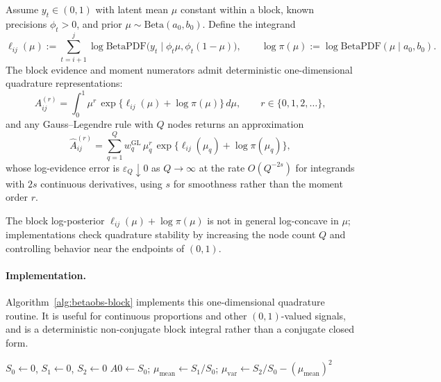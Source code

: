 \begin{proposition}
\label{prop:beta-block}
Assume $y_t\in(0,1)$ with latent mean $\mu$ constant within a block, known precisions
$\phi_t>0$, and prior $\mu\sim\mathrm{Beta}(a_0,b_0)$. Define the integrand
\[
\ell_{ij}(\mu)
:= \sum_{t=i+1}^j \log\mathrm{BetaPDF}\big(y_t\mid\phi_t\mu,\phi_t(1-\mu)\big),
\qquad \log\pi(\mu) := \log\mathrm{BetaPDF}(\mu\mid a_0,b_0).
\]
The block evidence and moment numerators admit deterministic one-dimensional quadrature
representations:
\[
A^{(r)}_{ij}
= \int_0^1 \mu^r\,\exp\!\big\{\ell_{ij}(\mu)+\log\pi(\mu)\big\}\,d\mu,
\qquad r\in\{0,1,2,\dots\},
\]
and any Gauss--Legendre rule with $Q$ nodes returns an approximation
\[
\widehat A^{(r)}_{ij}
= \sum_{q=1}^Q w_q^{\mathrm{GL}}\,\mu_q^r\,\exp\{\ell_{ij}(\mu_q)+\log\pi(\mu_q)\},
\]
whose log-evidence error is $\varepsilon_Q\downarrow 0$ as $Q\to\infty$ at the rate $O(Q^{-2s})$
for integrands with $2s$ continuous derivatives, using $s$ for smoothness rather than the moment
order $r$.
\end{proposition}

\begin{remark}
\label{rem:beta-quadrature-stability}
The block log-posterior $\ell_{ij}(\mu)+\log\pi(\mu)$ is not in general log-concave in $\mu$;
implementations check quadrature stability by increasing the node count $Q$ and controlling
behavior near the endpoints of $(0,1)$.
\end{remark}

\paragraph{Implementation.}
Algorithm~\ref{alg:betaobs-block} implements this one-dimensional quadrature routine. It is useful for continuous proportions and other $(0,1)$-valued signals, and is a deterministic non-conjugate block integral rather than a conjugate closed form.

\begin{algorithm}[H]
\caption{BetaObsBlock$(y,\phi,i,j,a_0,b_0,\{\mu_g,w_g\}_{g=1}^G)$}
\label{alg:betaobs-block}
\KwIn{Block $(i,j]$; observations $y_{i+1:j}\in(0,1)$; known precisions $\phi_{i+1:j}$; Beta prior $(a_0,b_0)$; quadrature nodes $\{\mu_g,w_g\}$}
$S_0\leftarrow 0$, $S_1\leftarrow 0$, $S_2\leftarrow 0$\;
$A0\leftarrow S_0$;\quad
$\mu_{\text{mean}}\leftarrow S_1/S_0$;\quad
$\mu_{\text{var}}\leftarrow S_2/S_0 - (\mu_{\text{mean}})^2$\;
\end{algorithm}

